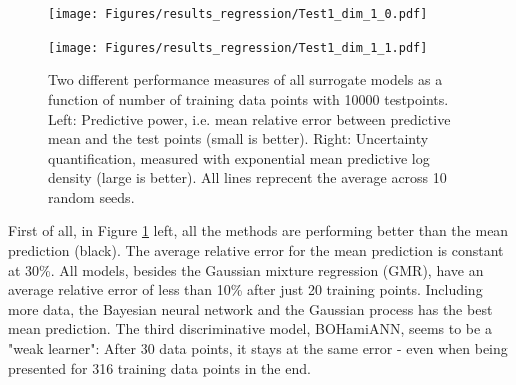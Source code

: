 \begin{figure}[bth]
  \centering
  \begin{minipage}[b]{0.49\textwidth}
   \texttt{[image: Figures/results\_regression/Test1\_dim\_1\_0.pdf]}
  \end{minipage}
  \hfill
  \begin{minipage}[b]{0.49\textwidth}
    \texttt{[image: Figures/results\_regression/Test1\_dim\_1\_1.pdf]}
   \end{minipage}
  \caption{Two different performance measures of all surrogate models as a function of number of
  training data points with 10000 testpoints. Left: Predictive power, i.e. mean relative error
  between predictive mean and the test points (small is better). Right: Uncertainty quantification, measured
  with exponential mean predictive log density (large is better). All lines reprecent the average
  across 10 random seeds.}
  \label{Test1_reg_plot}
\end{figure}

First of all, in Figure \ref{Test1_reg_plot} left, all the methods are performing better than the
mean prediction (black). The average relative error for the mean prediction is constant at 30\%. All
models, besides the Gaussian mixture regression (GMR), have an average relative error of less than
10\% after just 20 training points. Including more data, the Bayesian neural network and the
Gaussian process has the best mean prediction. The third discriminative model, BOHamiANN, seems to
be a "weak learner": After 30 data points, it stays at the same error - even when being presented
for 316 training data points in the end. 

